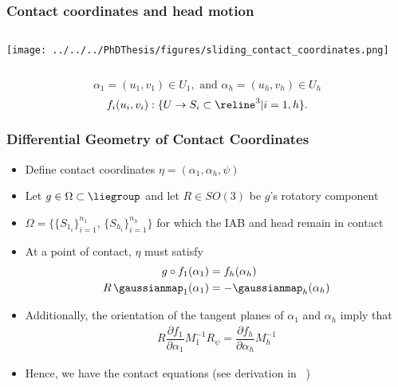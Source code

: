 \begin{frame}
\frametitle{Contact coordinates and head motion}
	\begin{columns}[c]
		\begin{column}{0.95\textwidth}
			\centering
			\texttt{[image: ../../../PhDThesis/figures/sliding\_contact\_coordinates.png]} \\
		\end{column}		
	\end{columns}
	\[
		\alpha_1 = \left(u_1, v_1\right) \in U_1, \text{ and } \alpha_h = \left(u_h, v_h\right) \in U_h
	\]
	\[
	f_i(u_i, v_i): \{U \rightarrow S_i \subset \reline^3 | i = 1, h\}.
	\]
\end{frame}
%
\begin{frame}
	\frametitle{Differential Geometry of Contact Coordinates}
	\begin{itemize}
		\tiny 
		\item Define contact coordinates $\eta = \left(\alpha_1, \alpha_h, \psi\right)$			
		\vspace{0.1in}
		\item  Let  $g \in \Omega \subset \liegroup$ and let $R \in SO(3)$ be $g$'s rotatory component 	
		\vspace{0.1in}
		\item $\Omega = \{\{S_{1_i}\}_{i = 1}^{n_1}$, $\{S_{h_i}\}_{i = 1}^{n_h}\}$ for which the IAB and head remain in contact	
		\vspace{0.1in}
		\item At a point of contact, $\eta$ must satisfy
		\begin{subequations}
			\begin{align}
			g \circ f_1(\alpha_1) &= f_h(\alpha_h)  \label{eq:contact_equal} \\
			R \, \gaussianmap_1(\alpha_1) &= - \gaussianmap_h(\alpha_h) \label{eq:gauss_equal}
			\end{align}
		\end{subequations}
		\item Additionally, the orientation of the tangent planes of $\alpha_1$ and $\alpha_h$ imply that
		\begin{align}
		R \dfrac{\partial f_1}{\partial \alpha_1} M_1^{-1} R_\psi = \dfrac{\partial f_h}{\partial \alpha_h} M_h^{-1}
		\label{eq:tangent_equal}
		\end{align}
		\item Hence, we have the contact equations (see derivation in ~\cite{OgunmoluThesis})

\end{itemize}
\end{frame}
